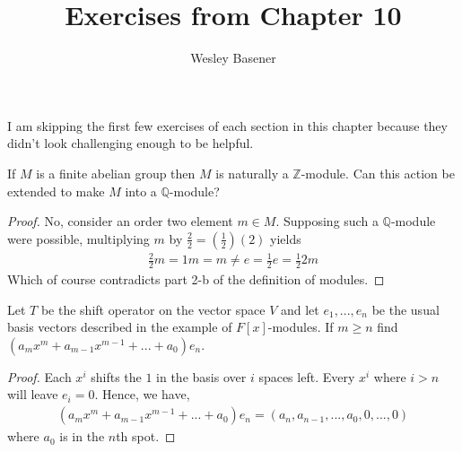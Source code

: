 \documentclass[10pt]{article}
\newcommand{\Z}{\mathbb{Z}}
\newcommand{\Q}{\mathbb{Q}}
\newenvironment{problem}[2][Problem]{\begin{trivlist}
		\item[\hskip \labelsep {\bfseries #1}\hskip \labelsep {\bfseries #2.}]}{\end{trivlist}}
\begin{document}
	
	\title{Exercises from Chapter 10}
	\author{Wesley Basener}
	\maketitle
	
	I am skipping the first few exercises of each section in this chapter because they didn't look challenging enough to be helpful.
	\begin{problem}{1.15}
		If $M$ is a finite abelian group then $M$ is naturally a $\Z$-module. Can this action be extended
		to make $M$ into a $\Q$-module?
		\begin{proof}
			No, consider an order two element $m \in M$. Supposing such a $\Q$-module were possible, multiplying $m$ by $\frac{2}{2} = (\frac{1}{2})(2)$ yields
			\begin{align*}
				\frac{2}{2}m = 1m = m \not= e = \frac{1}{2}e = \frac{1}{2}2m
			\end{align*}
			Which of course contradicts part 2-b of the definition of modules.
		\end{proof}
	\end{problem}
		
	\begin{problem}{1.17}
		Let $T$ be the shift operator on the vector space $V$ and let $e_1, ..., e_n$ be the usual basis vectors
		described in the example of $F[x]$-modules. If $m \geq n$ find $(a_m x^m +a_{m-1}x^{m-1} + ... + a_0 )e_n$.
		\begin{proof}
			Each $x^i$ shifts the $1$ in the basis over $i$ spaces left. Every $x^i$ where $i > n$ will leave $e_i = 0$. Hence, we have,
			\begin{align*}
				(a_m x^m +a_{m-1}x^{m-1} + ... + a_0 )e_n =
				(a_n, a_{n-1}, ..., a_0, 0, ..., 0)
			\end{align*} 
			where $a_0$ is in the $n$th spot.
		\end{proof}
	\end{problem}
	
\end{document}
